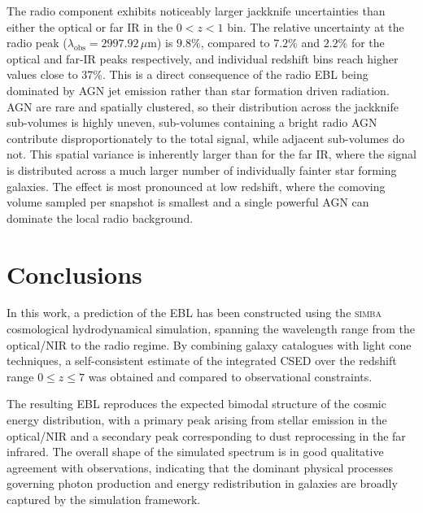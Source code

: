 \documentclass[
    a4paper, %
    10pt, %
    unnumberedsections, %
]{LTJournalArticle}
\begin{document}
The radio component exhibits noticeably larger jackknife uncertainties than either the optical or far IR in the $0 < z < 1$ bin. The relative uncertainty at the radio peak ($\lambda_\mathrm{obs} = 2997.92\,\mu$m) is $9.8\%$, compared to $7.2\%$ and $2.2\%$ for the optical and far-IR peaks respectively, and individual redshift bins reach higher values close to 37\%. This is a direct consequence of the radio EBL being dominated by AGN jet emission rather than star formation driven radiation. AGN are rare and spatially clustered, so their distribution across the jackknife sub-volumes is highly uneven, sub-volumes containing a bright radio AGN contribute disproportionately to the total signal, while adjacent sub-volumes do not. This spatial variance is inherently larger than for the far IR, where the signal is distributed across a much larger number of individually fainter star forming galaxies. The effect is most pronounced at low redshift, where the comoving volume sampled per snapshot is smallest and a single powerful AGN can dominate the local radio background.

\section{Conclusions}

In this work, a prediction of the EBL has been constructed using the \textsc{simba} cosmological hydrodynamical simulation, spanning the wavelength range from the optical/NIR to the radio regime. By combining galaxy catalogues with light cone techniques, a self-consistent estimate of the integrated CSED over the redshift range $0 \leq z \leq 7$ was obtained and compared to observational constraints.

The resulting EBL reproduces the expected bimodal structure of the cosmic energy distribution, with a primary peak arising from stellar emission in the optical/NIR and a secondary peak corresponding to dust reprocessing in the far infrared. The overall shape of the simulated spectrum is in good qualitative agreement with observations, indicating that the dominant physical processes governing photon production and energy redistribution in galaxies are broadly captured by the simulation framework.

\end{document}
